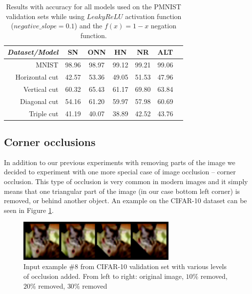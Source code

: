 \documentclass[b5paper]{book}
\begin{document}
\begin{table}[ht]
  \centering
  \begin{tabular}{rS[table-format=2.1]S[table-format=2.1]S[table-format=2.1]S[table-format=2.1]S[table-format=2.1]S[table-format=2.1]}
    \toprule
     \textit{Dataset/Model} & SN & ONN & HN & NR & ALT \\
    \midrule
    {MNIST} & {98.96} & {98.97} & {99.12} & {99.21} & {99.06} \\
    {Horizontal cut} & {42.57} & {53.36} & {49.05} & {51.53} & {47.96} \\
    {Vertical cut} & {60.32} & {65.43} & {61.17} & {69.80} & {63.84} \\
    {Diagonal cut} & {54.16} & {61.20} & {59.97} & {57.98} & {60.69} \\
    {Triple cut} & {41.19} & {40.07} & {38.89} & {42.52} & {43.76} \\
    
    \bottomrule
  \end{tabular}
  \caption{Results with accuracy for all models used on the PMNIST validation sets while using \( LeakyReLU \) activation function (\( negative\_slope = 0.1\)) and the \( f(x) = 1 - x \) negation function.}
  \label{tab:results-leakyrelu}
\end{table} 

\subsection{Corner occlusions}

In addition to our previous experiments with removing parts of the image we decided to experiment with one more special case of image occlusion -- corner occlusion. This type of occlusion is very common in modern images and it simply means that one triangular part of the image (in our case bottom left corner) is removed, or behind another object. An example on the CIFAR-10 dataset can be seen in Figure \ref{fig:cbomf3}.

\begin{figure}
    \centering
    \includegraphics[width=0.7\textwidth]{figures/fig3.png}
\caption{Input example \#8 from CIFAR-10 validation set with various levels of occlusion added. From left to right: original image, \( 10\% \) removed, \( 20\% \) removed, \( 30\% \) removed}
\label{fig:cbomf3} 
\end{figure}
\end{document}
